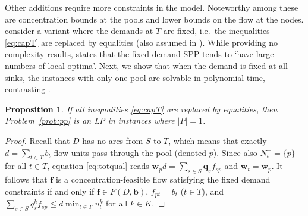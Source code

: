 \documentclass[pdflatex,sn-mathphys-num]{sn-jnl}%
\theoremstyle{thmstyleone}%
\newtheorem{proposition}[theorem]{Proposition}%
\begin{document}
Other additions require more constraints in the model.
Noteworthy among these are concentration bounds at the pools \cite{ruiz13} and lower bounds on the flow at the nodes.
\citet{grothey23} consider a variant where the demands at $T$ are fixed, i.e.\ the inequalities \eqref{eq:capT} are replaced by equalities
(also assumed in \cite{ruiz13}).
While providing no complexity results, \cite{grothey23} states that the fixed-demand SPP tends to `have large numbers of local optima'.
Next, we show that when the demand is fixed at all sinks, the instances with only one pool are solvable in polynomial time,
contrasting \cite[Corollary 1]{alfaki13a}.
\begin{proposition} \label{prop:grothey1}
If all inequalities \eqref{eq:capT} are replaced by equalities, then Problem~\ref{prob:pp} is an LP in instances where $|P|=1$. 
\end{proposition}
\begin{proof}
Recall that $D$ has no arcs from $S$ to $T$, which means that exactly $d=\sum_{t\in T}b_t$
flow units pass through the pool (denoted $p$).
Since also $N_t^-=\{p\}$ for all $t\in T$, equation \eqref{eq:totqual} reads
$\boldsymbol{w}_pd = \sum_{s\in S}\boldsymbol{q}_sf_{sp}$ and $\boldsymbol{w}_t=\boldsymbol{w}_p$.
It follows that $\boldsymbol{f}$ is a concentration-feasible flow satisfying the fixed demand constraints
if and only if $\boldsymbol{f}\in F(D,\boldsymbol{b})$, $f_{pt}=b_t$ ($t\in T$), and
$\sum_{s\in S}q_s^kf_{sp}\leq d\min_{t\in T}u_t^k$ for all $k\in K$.
\end{proof}
\end{document}
